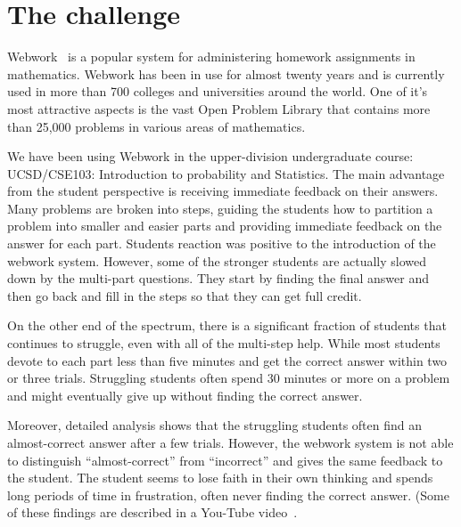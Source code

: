\documentclass{sigchi}
\begin{document}


\section{The challenge}
Webwork~\cite{WebWork} is a popular system for administering homework
assignments in mathematics. Webwork has been in use for almost twenty
years and is currently used in more than 700 colleges and universities
around the world. One of it's most attractive aspects is the vast
Open Problem Library that contains more than 25,000 problems in
various areas of mathematics.

We have been using Webwork in the upper-division undergraduate course:
UCSD/CSE103: Introduction to probability and Statistics. The main
advantage from the student perspective is receiving immediate feedback
on their answers. Many problems are broken into steps, guiding the
students how to partition a problem into smaller and easier parts and
providing immediate feedback on the answer for each part. Students
reaction was positive to the introduction of the webwork
system. However, some of the stronger students are actually slowed
down by the multi-part questions. They start by finding the final
answer and then go back and fill in the steps so that they can get
full credit.

On the other end of the spectrum, there is a significant fraction of
students that continues to struggle, even with all of the multi-step
help.  While most students devote to each part less than five minutes
and get the correct answer within two or three trials. Struggling
students often spend 30 minutes or more on a problem and might
eventually give up without finding the correct answer.

Moreover, detailed analysis shows that the struggling students often
find an almost-correct answer after a few trials. However, the webwork
system is not able to distinguish ``almost-correct'' from
``incorrect'' and gives the same feedback to the student. The student
seems to lose faith in their own thinking and spends long periods of
time in frustration, often never finding the correct answer.  (Some of
these findings are described in a You-Tube video~\cite{ElkherjFr2013}.
\end{document}
